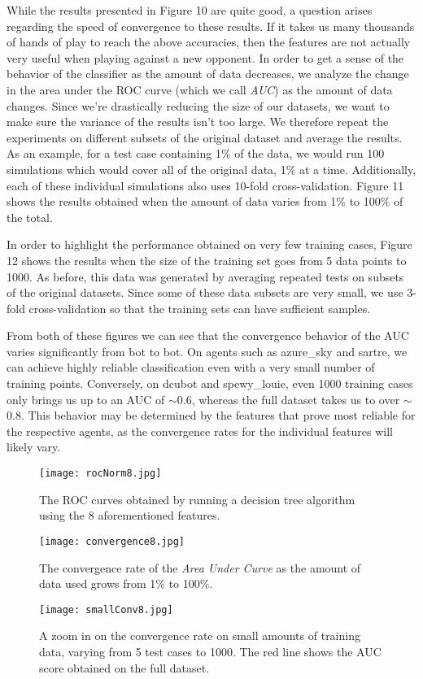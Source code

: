 \documentclass[letterpaper]{article}
\begin{document}
While the results presented in Figure 10 are quite good, a question arises regarding the speed of convergence to these results. If it takes us many thousands of hands of play to reach the above accuracies, then the features are not actually very useful when playing against a new opponent. In order to get a sense of the behavior of the classifier as the amount of data decreases, we analyze the change in the area under the ROC curve (which we call \emph{AUC}) as the amount of data changes. Since we're drastically reducing the size of our datasets, we want to make sure the variance of the results isn't too large. We therefore repeat the experiments on different subsets of the original dataset and average the results. As an example, for a test case containing 1\% of the data, we would run 100 simulations which would cover all of the original data, 1\% at a time. Additionally, each of these individual simulations also uses 10-fold cross-validation. Figure 11 shows the results obtained when the amount of data varies from 1\% to 100\% of the total. 

In order to highlight the performance obtained on very few training cases, Figure 12 shows the results when the size of the training set goes from 5 data points to 1000. As before, this data was generated by averaging repeated tests on subsets of the original datasets. Since some of these data subsets are very small, we use 3-fold cross-validation so that the training sets can have sufficient samples.

From both of these figures we can see that the convergence behavior of the AUC varies significantly from bot to bot. On agents such as azure\_sky and sartre, we can achieve highly reliable classification even with a very small number of training points. Conversely, on dcubot and spewy\_louie, even 1000 training cases only brings us up to an AUC of $\sim$0.6, whereas the full dataset takes us to over $\sim$0.8. This behavior may be determined by the features that prove most reliable for the respective agents, as the convergence rates for the individual features will likely vary.

\onecolumn
\begin{figure}[H]
    \centering
    \texttt{[image: rocNorm8.jpg]}
    \caption{The ROC curves obtained by running a decision tree algorithm using the 8 aforementioned features.}
\end{figure}
\begin{figure}[H]
    \centering
    \texttt{[image: convergence8.jpg]}
    \caption{The convergence rate of the \emph{Area Under Curve} as the amount of data used grows from 1\% to 100\%.}
\end{figure}
\begin{figure}[H]
    \centering
    \texttt{[image: smallConv8.jpg]}
    \caption{A zoom in on the convergence rate on small amounts of training data, varying from 5 test cases to 1000. The red line shows the AUC score obtained on the full dataset.}
\end{figure}
\twocolumn
\end{document}
